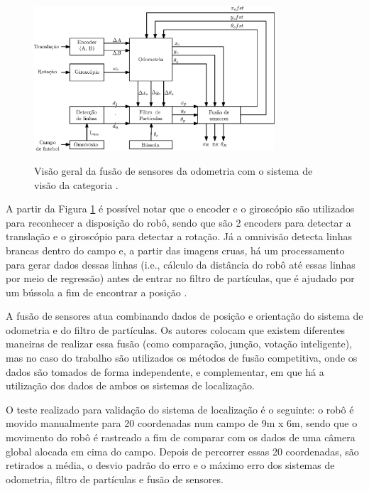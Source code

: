 \documentclass[acronym, symbols, table]{fei}
\begin{document}
	\begin{figure}[!htb]
		\centering
		\caption{Visão geral da fusão de sensores da odometria com o sistema de visão da categoria .} 
		\includegraphics[width=0.8\textwidth]{msl_sensor_fusion.eps}
		\label{fig:msl_sensor_fusion}
	\end{figure}
	
	A partir da Figura \ref{fig:msl_sensor_fusion} é possível notar que o encoder e o giroscópio são utilizados para reconhecer a disposição do robô, sendo que são 2 encoders para detectar a translação e o giroscópio para detectar a rotação. Já a omnivisão detecta linhas brancas dentro do campo e, a partir das imagens cruas, há um processamento para gerar dados dessas linhas (i.e., cálculo da distância do robô até essas linhas por meio de regressão) antes de entrar no filtro de partículas, que é ajudado por um bússola a fim de encontrar a posição .
	
	
	A fusão de sensores atua combinando dados de posição e orientação do sistema de odometria e do filtro de partículas. Os autores colocam que existem diferentes maneiras de realizar essa fusão (como comparação, junção, votação inteligente), mas no caso do trabalho são utilizados os métodos de fusão competitiva, onde os dados são tomados de forma independente, e complementar, em que há a utilização dos dados de ambos os sistemas de localização.
	
	O teste realizado para validação do sistema de localização é o seguinte: o robô é movido manualmente para 20 coordenadas num campo de 9m x 6m, sendo que o movimento do robô é rastreado a fim de comparar com os dados de uma câmera global alocada em cima do campo. Depois de percorrer essas 20 coordenadas, são retirados a média, o desvio padrão do erro e o máximo erro dos sistemas de odometria, filtro de partículas e fusão de sensores.
	
\end{document}
